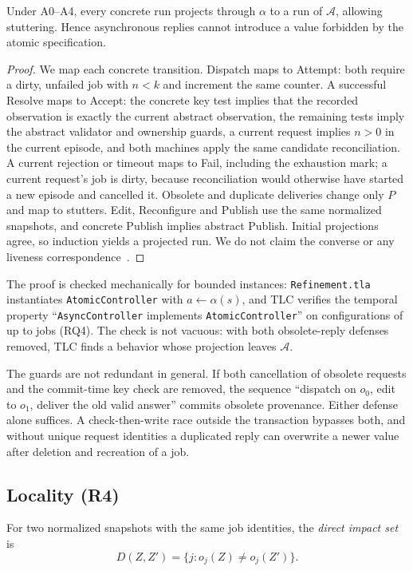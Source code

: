 \begin{theorem}\label{thm:refinement}
Under A0--A4, every concrete run projects through $\alpha$ to a run of $\mathcal A$, allowing stuttering. Hence asynchronous replies cannot introduce a value forbidden by the atomic specification.
\end{theorem}
\begin{proof}
We map each concrete transition. Dispatch maps to Attempt: both require a dirty, unfailed job with $n<k$ and increment the same counter. A successful Resolve maps to Accept: the concrete key test implies that the recorded observation is exactly the current abstract observation, the remaining tests imply the abstract validator and ownership guards, a current request implies $n>0$ in the current episode, and both machines apply the same candidate reconciliation. A current rejection or timeout maps to Fail, including the exhaustion mark; a current request's job is dirty, because reconciliation would otherwise have started a new episode and cancelled it. Obsolete and duplicate deliveries change only $P$ and map to stutters. Edit, Reconfigure and Publish use the same normalized snapshots, and concrete Publish implies abstract Publish. Initial projections agree, so induction yields a projected run. We do not claim the converse or any liveness correspondence~\cite{lynch1995simulations,abadi1991refinement}.
\end{proof}

The proof is checked mechanically for bounded instances: \texttt{Refinement.tla} instantiates \texttt{AtomicController} with $a\gets\alpha(s)$, and TLC verifies the temporal property ``\texttt{AsyncController} implements \texttt{AtomicController}'' on \TLCRefineConfigs{} configurations of up to \TLCExtMaxJobs{} jobs (RQ4). The check is not vacuous: with both obsolete-reply defenses removed, TLC finds a behavior whose projection leaves $\mathcal A$.

The guards are not redundant in general. If both cancellation of obsolete requests and the commit-time key check are removed, the sequence ``dispatch on $o_0$, edit to $o_1$, deliver the old valid answer'' commits obsolete provenance. Either defense alone suffices. A check-then-write race outside the transaction bypasses both, and without unique request identities a duplicated reply can overwrite a newer value after deletion and recreation of a job.

\subsection{Locality (R4)}
For two normalized snapshots with the same job identities, the \emph{direct impact set} is
\begin{equation}\label{eq:impact}
D(Z,Z')=\{j : o_j(Z)\ne o_j(Z')\}.
\end{equation}

